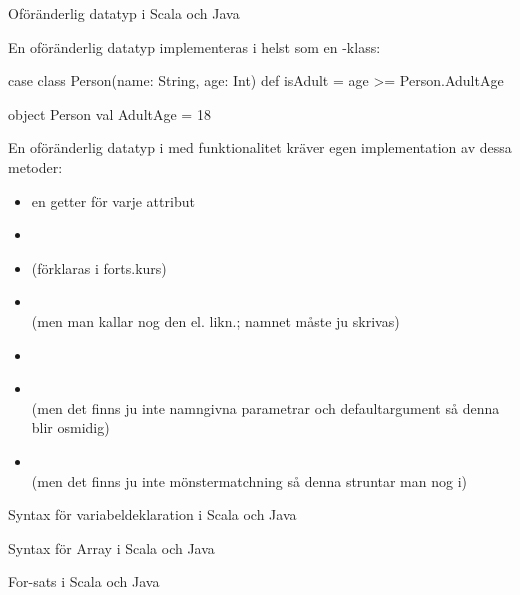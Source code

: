 \begin{Slide}{Oföränderlig datatyp i Scala och Java}\SlideFontTiny
\vspace{-0.5em}
\begin{multicols}{2}

En oföränderlig datatyp implementeras i  helst som en \pause{}-klass:

\begin{CodeSmall}[basicstyle=\ttfamily\SlideFontSize{5.7}{6.7}]
case class Person(name: String, age: Int){
  def isAdult = age >= Person.AdultAge
}

object Person {
  val AdultAge = 18
}
\end{CodeSmall}

\columnbreak

En oföränderlig datatyp i  med  funktionalitet kräver egen implementation av dessa metoder: 
\vspace{-0.25em}
\begin{itemize}
\item en getter för varje attribut
\item {}
\item {} (förklaras i forts.kurs)
\item {} \\ (men man kallar nog den  el. likn.; namnet måste ju skrivas)
\item {}
\item {} \\ (men det finns ju inte namngivna parametrar och defaultargument så denna blir osmidig)
\item {} \\ (men det finns ju inte mönstermatchning så denna struntar man nog i)
\end{itemize}

\end{multicols}

\end{Slide}

\begin{Slide}{Syntax för variabeldeklaration i Scala och Java}
\end{Slide}


\begin{Slide}{Syntax för Array i Scala och Java}
\end{Slide}

\begin{Slide}{For-sats i Scala och Java}
\end{Slide}


